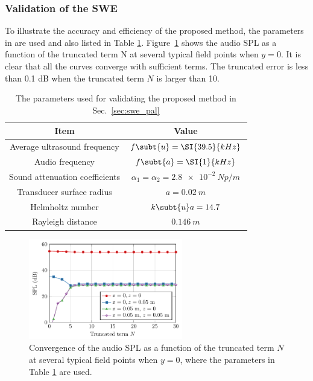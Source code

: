 \subsubsection{Validation of the SWE}
To illustrate the accuracy and efficiency of the proposed method, the parameters in \cite{Cervenka2019VersatileComputationalApproach} are used and also listed in Table \ref{tab:swe:pal:parameter}. 
Figure~\ref{fig:swe:pal:valid} shows the audio SPL as a function of the truncated term N at several typical field points when $y = 0$. 
It is clear that all the curves converge with sufficient terms. 
The truncated error is less than 0.1 dB when the truncated term $N$ is larger than 10.

\begin{table}
    \centering
    \begin{tabular}{cc}
        \toprule
        Item	& Value\\
        \midrule
        Average ultrasound frequency	& $f\subt{u} = \SI{39.5}{kHz}$\\
        Audio frequency	& $f\subt{a} = \SI{1}{kHz}$\\
        Sound attenuation coefficients	& $\alpha_1 = \alpha_2 = \SI{2.8e-2}{Np/m}$\\
        Transducer surface radius	&$a = \SI{0.02}{m}$\\
        Helmholtz number	& $k\subt{u}a =14.7$\\
        Rayleigh distance	& $\SI{0.146}{m}$\\
        \bottomrule
    \end{tabular}
    \caption{The parameters used for validating the proposed method in Sec.~\ref{sec:swe_pal}}
    \label{tab:swe:pal:parameter}
\end{table}
\begin{figure}[h]
    \centering
    \includegraphics[width = 0.6\textwidth]{Figures/show_TruncatedTerms_200802K_v2.pdf}
    \caption{Convergence of the audio SPL  as a function of the truncated term $N$ at several typical field points when $y = 0$, where the parameters in Table \ref{tab:swe:pal:parameter} are used.}
    \label{fig:swe:pal:valid}
\end{figure}

